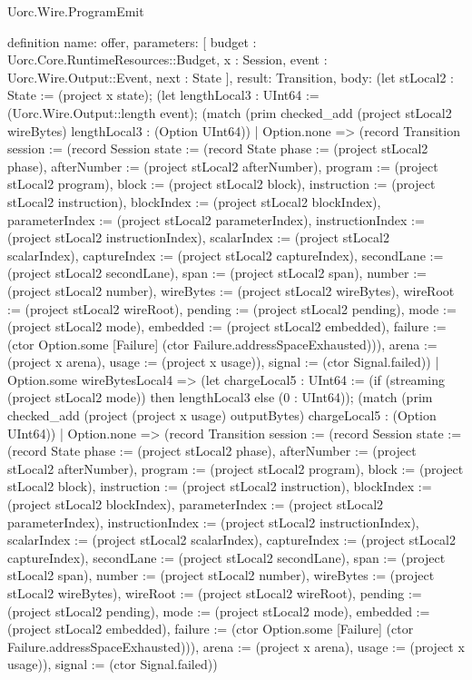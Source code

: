 \begin{lexlean}{Uorc.Wire.ProgramEmit}
\begin{semanticmodule}
definition{
  name: offer,
  parameters: [
    budget : Uorc.Core.RuntimeResources::Budget,
    x : Session,
    event : Uorc.Wire.Output::Event,
    next : State
  ],
  result: Transition,
  body: (let stLocal2 : State := (project x state); (let lengthLocal3 : UInt64 := (Uorc.Wire.Output::length event); (match (prim checked_add (project stLocal2 wireBytes) lengthLocal3 : (Option UInt64))
    | Option.none => (record Transition {session := (record Session {state := (record State {phase := (project stLocal2 phase), afterNumber := (project stLocal2 afterNumber), program := (project stLocal2 program), block := (project stLocal2 block), instruction := (project stLocal2 instruction), blockIndex := (project stLocal2 blockIndex), parameterIndex := (project stLocal2 parameterIndex), instructionIndex := (project stLocal2 instructionIndex), scalarIndex := (project stLocal2 scalarIndex), captureIndex := (project stLocal2 captureIndex), secondLane := (project stLocal2 secondLane), span := (project stLocal2 span), number := (project stLocal2 number), wireBytes := (project stLocal2 wireBytes), wireRoot := (project stLocal2 wireRoot), pending := (project stLocal2 pending), mode := (project stLocal2 mode), embedded := (project stLocal2 embedded), failure := (ctor Option.some [Failure] (ctor Failure.addressSpaceExhausted))}), arena := (project x arena), usage := (project x usage)}), signal := (ctor Signal.failed)})
    | Option.some wireBytesLocal4 => (let chargeLocal5 : UInt64 := (if (streaming (project stLocal2 mode)) then lengthLocal3 else (0 : UInt64)); (match (prim checked_add (project (project x usage) outputBytes) chargeLocal5 : (Option UInt64))
      | Option.none => (record Transition {session := (record Session {state := (record State {phase := (project stLocal2 phase), afterNumber := (project stLocal2 afterNumber), program := (project stLocal2 program), block := (project stLocal2 block), instruction := (project stLocal2 instruction), blockIndex := (project stLocal2 blockIndex), parameterIndex := (project stLocal2 parameterIndex), instructionIndex := (project stLocal2 instructionIndex), scalarIndex := (project stLocal2 scalarIndex), captureIndex := (project stLocal2 captureIndex), secondLane := (project stLocal2 secondLane), span := (project stLocal2 span), number := (project stLocal2 number), wireBytes := (project stLocal2 wireBytes), wireRoot := (project stLocal2 wireRoot), pending := (project stLocal2 pending), mode := (project stLocal2 mode), embedded := (project stLocal2 embedded), failure := (ctor Option.some [Failure] (ctor Failure.addressSpaceExhausted))}), arena := (project x arena), usage := (project x usage)}), signal := (ctor Signal.failed)})
}
\end{semanticmodule}
\end{lexlean}
